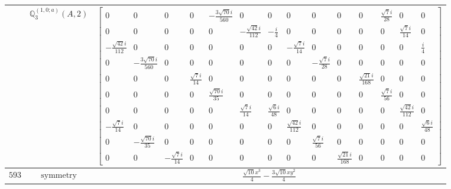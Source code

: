 \documentclass[fleqn,8pt,landscape]{jsarticle}
\begin{document}
\begin{longtable}{ccc}
$  $ & $ \mathbb{Q}_{3}^{(1,0;a)}(A,2) $ & $ \begin{bmatrix} 0 & 0 & 0 & 0 & - \frac{3 \sqrt{70} i}{560} & 0 & 0 & 0 & 0 & 0 & 0 & \frac{\sqrt{7} i}{28} & 0 & 0 \\ 0 & 0 & 0 & 0 & 0 & - \frac{\sqrt{42} i}{112} & - \frac{i}{4} & 0 & 0 & 0 & 0 & 0 & \frac{\sqrt{7} i}{14} & 0 \\ - \frac{\sqrt{42} i}{112} & 0 & 0 & 0 & 0 & 0 & 0 & - \frac{\sqrt{7} i}{14} & 0 & 0 & 0 & 0 & 0 & \frac{i}{4} \\ 0 & - \frac{3 \sqrt{70} i}{560} & 0 & 0 & 0 & 0 & 0 & 0 & - \frac{\sqrt{7} i}{28} & 0 & 0 & 0 & 0 & 0 \\ 0 & 0 & 0 & \frac{\sqrt{7} i}{14} & 0 & 0 & 0 & 0 & 0 & 0 & \frac{\sqrt{21} i}{168} & 0 & 0 & 0 \\ 0 & 0 & 0 & 0 & \frac{\sqrt{70} i}{35} & 0 & 0 & 0 & 0 & 0 & 0 & \frac{\sqrt{7} i}{56} & 0 & 0 \\ 0 & 0 & 0 & 0 & 0 & \frac{\sqrt{7} i}{14} & \frac{\sqrt{6} i}{48} & 0 & 0 & 0 & 0 & 0 & \frac{\sqrt{42} i}{112} & 0 \\ - \frac{\sqrt{7} i}{14} & 0 & 0 & 0 & 0 & 0 & 0 & \frac{\sqrt{42} i}{112} & 0 & 0 & 0 & 0 & 0 & \frac{\sqrt{6} i}{48} \\ 0 & - \frac{\sqrt{70} i}{35} & 0 & 0 & 0 & 0 & 0 & 0 & \frac{\sqrt{7} i}{56} & 0 & 0 & 0 & 0 & 0 \\ 0 & 0 & - \frac{\sqrt{7} i}{14} & 0 & 0 & 0 & 0 & 0 & 0 & \frac{\sqrt{21} i}{168} & 0 & 0 & 0 & 0 \end{bmatrix} $ \\ \hline
$ 593 $ & $ \text{symmetry} $ & $ \frac{\sqrt{10} x^{3}}{4} - \frac{3 \sqrt{10} x y^{2}}{4} $ \\

\end{longtable}
\end{document}

